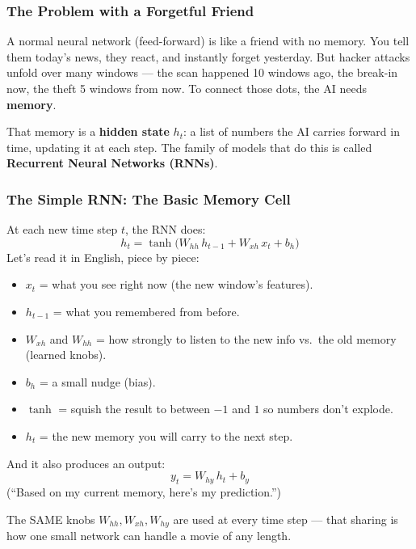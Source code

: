 \documentclass[11pt,a4paper]{article}
\begin{document}
\subsubsection{The Problem with a Forgetful Friend}

A normal neural network (feed-forward) is like a friend with no memory. You
tell them today's news, they react, and instantly forget yesterday. But hacker
attacks unfold over many windows --- the scan happened 10 windows ago, the
break-in now, the theft 5 windows from now. To connect those dots, the AI needs
\textbf{memory}.

That memory is a \textbf{hidden state} $h_t$: a list of numbers the AI carries
forward in time, updating it at each step. The family of models that do this
is called \textbf{Recurrent Neural Networks (RNNs)}.

\subsubsection{The Simple RNN: The Basic Memory Cell}

At each new time step $t$, the RNN does:
\[
h_t = \tanh\big( W_{hh}\, h_{t-1} + W_{xh}\, x_t + b_h \big)
\]
Let's read it in English, piece by piece:

\begin{itemize}[leftmargin=1.6em,itemsep=2pt]
  \item $x_t$ = what you see right now (the new window's features).
  \item $h_{t-1}$ = what you remembered from before.
  \item $W_{xh}$ and $W_{hh}$ = how strongly to listen to the new info vs.\ the
        old memory (learned knobs).
  \item $b_h$ = a small nudge (bias).
  \item $\tanh$ = squish the result to between $-1$ and $1$ so numbers don't
        explode.
  \item $h_t$ = the new memory you will carry to the next step.
\end{itemize}

And it also produces an output:
\[
y_t = W_{hy}\, h_t + b_y
\]
(``Based on my current memory, here's my prediction.'')

The SAME knobs $W_{hh}, W_{xh}, W_{hy}$ are used at every time step --- that
sharing is how one small network can handle a movie of any length.
\end{document}
